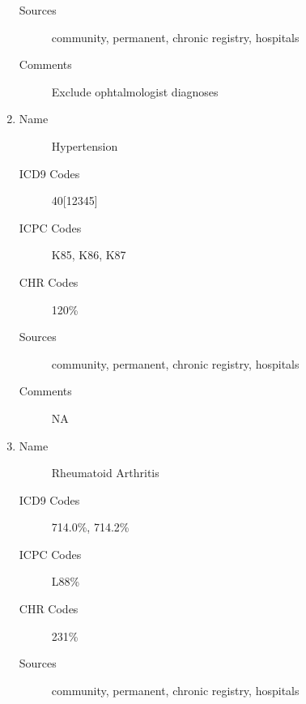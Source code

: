 \documentclass[a4paper,12pt]{article}
\begin{document}
\begin{appendices}
\begin{enumerate}
\begin{description}
   						\item[Sources] community, permanent, chronic registry, hospitals
   						\item[Comments] Exclude ophtalmologist diagnoses
   					\end{description}
   					\item
   					\begin{description}
   						\item[Name] Hypertension
   						\item[ICD9 Codes] 40[12345]
   						\item[ICPC Codes] K85, K86, K87
   						\item[CHR Codes] 120\%
   						\item[Sources] community, permanent, chronic registry, hospitals
   						\item[Comments] NA
   					\end{description}
   					\item
   					\begin{description}
   						\item[Name] Rheumatoid Arthritis
   						\item[ICD9 Codes] 714.0\%, 714.2\%
   						\item[ICPC Codes] L88\%
   						\item[CHR Codes] 231\%
   						\item[Sources] community, permanent, chronic registry, hospitals

\end{description}
\end{enumerate}
\end{appendices}
\end{document}
